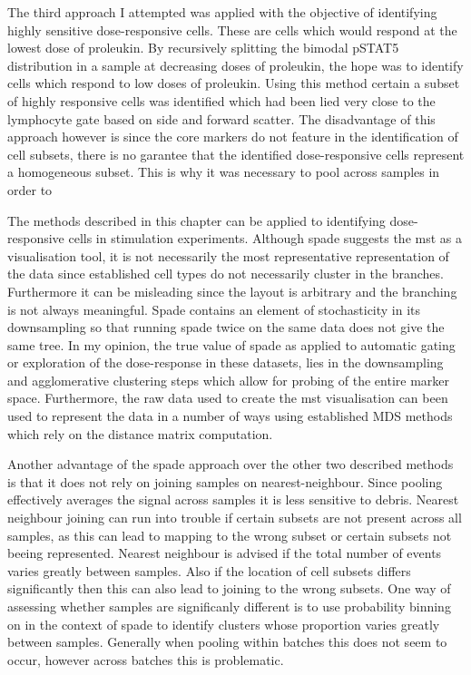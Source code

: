 The third approach I attempted was applied with the objective of identifying highly sensitive dose-responsive cells.
These are cells which would respond at the lowest dose of proleukin.
By recursively splitting the bimodal pSTAT5 distribution in a sample at decreasing doses of proleukin, the hope was to identify cells which respond to low doses of proleukin.
Using this method certain a subset of highly responsive cells was identified which had been lied very close to the lymphocyte gate based on side and forward scatter.
The disadvantage of this approach however is since the core markers do not feature in the identification of cell subsets, there is no garantee that the identified
dose-responsive cells represent a homogeneous subset.  This is why it was necessary to pool across samples in order to 

The methods described in this chapter can be applied to identifying dose-responsive cells in stimulation experiments.
Although spade suggests the mst as a visualisation tool, it is not necessarily the most representative representation of the data since
established cell types do not necessarily cluster in the branches.
Furthermore it can be misleading since the layout is arbitrary and the branching is not always meaningful.
Spade contains an element of stochasticity in its downsampling so that running spade twice on the same data does not give the same tree.
In my opinion, the true value of spade as applied to automatic gating or exploration of the dose-response in these datasets,
lies in the downsampling and agglomerative clustering steps which allow for probing of the entire marker space.
Furthermore, the raw data used to create the mst visualisation can been used to represent the data in a number of ways using established
MDS methods which rely on the distance matrix computation.

Another advantage of the spade approach over the other two described methods is that it does not rely on joining samples on nearest-neighbour.
Since pooling effectively averages the signal across samples it is less sensitive to debris.
Nearest neighbour joining can run into trouble if certain subsets are not present across all samples, as this can lead to mapping to the wrong subset
or certain subsets not beeing represented.
Nearest neighbour is advised if the total number of events varies greatly between samples.
Also if the location of cell subsets differs significantly then this can also lead to joining to the wrong subsets.
One way of assessing whether samples are significanly different is to use probability binning on in the context of spade to identify clusters whose proportion
varies greatly between samples.  Generally when pooling within batches this does not seem to occur, however across batches this is problematic. 


